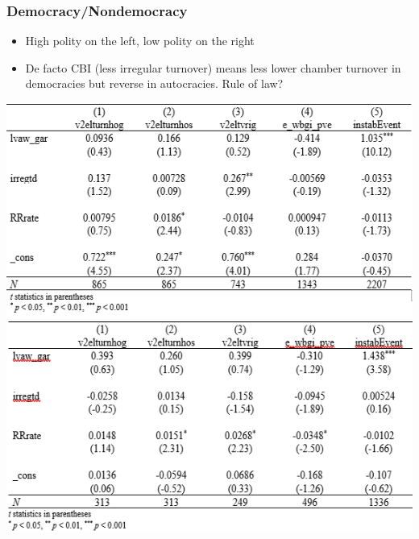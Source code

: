 \documentclass[]{beamer}
\begin{document}
\begin{frame}
    \frametitle{Democracy/Nondemocracy}
    \begin{itemize}
        \item High polity on the left, low polity on the right
        \item De facto CBI (less irregular turnover) means less lower chamber turnover in democracies but reverse in autocracies. Rule of law?
    \end{itemize}
    \includegraphics{img0013.png}
    \includegraphics{img0014.png}
\end{frame}
\end{document}
